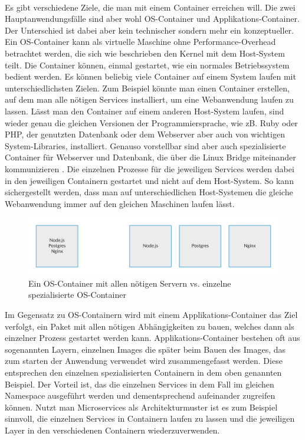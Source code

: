 \paragraph{}
Es gibt verschiedene Ziele, die man mit einem Container erreichen will. Die zwei Hauptanwendungsfälle sind aber wohl OS-Container und Applikations-Container. Der Unterschied ist dabei aber kein technischer sondern mehr ein konzeptueller.\\
Ein OS-Container kann als virtuelle Maschine ohne Performance-Overhead betrachtet werden, die sich wie beschrieben den Kernel mit dem Host-System teilt. Die Container können, einmal gestartet, wie ein normales Betriebssystem bedient werden. Es können beliebig viele Container auf einem System laufen mit unterschiedlichsten Zielen. Zum Beispiel könnte man einen Container erstellen, auf dem man alle nötigen Services installiert, um eine Webanwendung laufen zu lassen. Lässt man den Container auf einem anderen Host-System laufen, sind wieder genau die gleichen Versionen der Programmiersprache, wie zB. Ruby oder PHP, der genutzten Datenbank oder dem Webserver aber auch von wichtigen System-Libraries, installiert. Genauso vorstellbar sind aber auch spezialisierte Container für Webserver und Datenbank, die über die Linux Bridge miteinander kommunizieren \cite{ocvsac}. Die einzelnen Prozesse für die jeweiligen Services werden dabei in den jeweiligen Containern gestartet und nicht auf dem Host-System. So kann sichergestellt werden, dass man auf unterschiedlichen Host-Systemen die gleiche Webanwendung immer auf den gleichen Maschinen laufen lässt.

\begin{figure}[!ht]
  \centering
  \includegraphics[width=1\textwidth]{images/4-os-specialized-containers.png}
  \caption{Ein OS-Container mit allen nötigen Servern vs. einzelne spezialisierte OS-Container}
\end{figure}

Im Gegensatz zu OS-Containern wird mit einem Applikations-Container das Ziel verfolgt, ein Paket mit allen nötigen Abhängigkeiten zu bauen, welches dann als einzelner Prozess gestartet werden kann.
Applikations-Container bestehen oft aus sogenannten Layern, einzelnen Images die später beim Bauen des Images, das zum starten der Anwendung verwendet wird zusammengefasst werden. Diese entsprechen den einzelnen spezialisierten Containern in dem oben genannten Beispiel. Der Vorteil ist, das die einzelnen Services in dem Fall im gleichen Namespace ausgeführt werden und dementsprechend aufeinander zugreifen können. Nutzt man Microservices als Architekturmuster ist es zum Beispiel sinnvoll, die einzelnen Services in Containern laufen zu lassen und die jeweiligen Layer in den verschiedenen Containern wiederzuverwenden.

